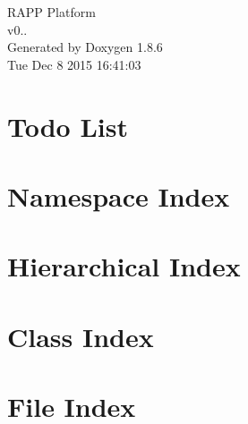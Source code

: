 \documentclass[twoside]{book}
\newcommand{\clearemptydoublepage}{%
  \newpage{\pagestyle{empty}\cleardoublepage}%
}
\begin{document}
\hypersetup{pageanchor=false}
\begin{titlepage}
\vspace*{7cm}
\begin{center}%
{\Large R\-A\-P\-P Platform \\[1ex]\large v0.. }\\
\vspace*{1cm}
{\large Generated by Doxygen 1.8.6}\\
\vspace*{0.5cm}
{\small Tue Dec 8 2015 16:41:03}\\
\end{center}
\end{titlepage}
\clearemptydoublepage
\tableofcontents
\clearemptydoublepage
{}
\hypersetup{pageanchor=true}

\chapter{Todo List}
\label{todo}
\hypertarget{todo}{}

\chapter{Namespace Index}

\chapter{Hierarchical Index}

\chapter{Class Index}

\chapter{File Index}

\end{document}

